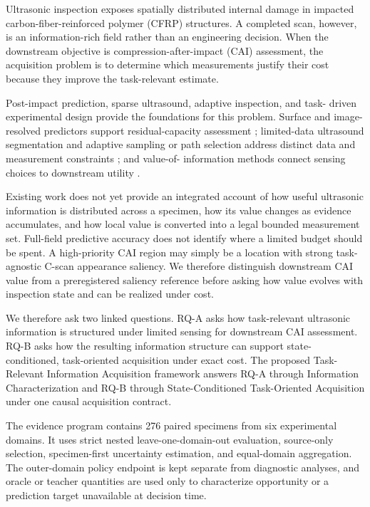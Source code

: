 \documentclass[preprint,12pt]{elsarticle}
\begin{document}
Ultrasonic inspection exposes spatially distributed internal damage in
impacted carbon-fiber-reinforced polymer (CFRP) structures. A completed scan,
however, is an information-rich field rather than an engineering decision.
When the downstream objective is compression-after-impact (CAI) assessment,
the acquisition problem is to determine which measurements justify their cost
because they improve the task-relevant estimate.

Post-impact prediction, sparse ultrasound, adaptive inspection, and task-
driven experimental design provide the foundations for this problem. Surface
and image-resolved predictors support residual-capacity assessment
\cite{hasebe2022internal,hasebe2025compression,bull2018image,mack2026cscan};
limited-data ultrasound segmentation and adaptive sampling or path
selection address distinct data and measurement constraints
\cite{nguyen2025sparse,ji2026adaptive,fuentes2020autonomous}; and value-of-
information methods connect sensing choices to downstream utility
\cite{blumberg2024experimental,memarzadeh2016value,cantero2020optimal}.

Existing work does not yet provide an integrated account of how useful
ultrasonic information is distributed across a specimen, how its value changes
as evidence accumulates, and how local value is converted into a legal bounded
measurement set. Full-field predictive accuracy does not identify where a
limited budget should be spent. A high-priority CAI region may simply be a
location with strong task-agnostic C-scan appearance saliency. We therefore
distinguish downstream CAI value from a preregistered saliency reference before
asking how value evolves with inspection state and can be realized under cost.

We therefore ask two linked questions. RQ-A asks how task-relevant ultrasonic
information is structured under limited sensing for downstream CAI assessment.
RQ-B asks how the resulting information structure can support state-
conditioned, task-oriented acquisition under exact cost. The proposed Task-
Relevant Information Acquisition framework answers RQ-A through Information
Characterization and RQ-B through State-Conditioned Task-Oriented Acquisition
under one causal acquisition contract.

The evidence program contains 276 paired specimens from six experimental
domains. It uses strict nested leave-one-domain-out evaluation, source-only
selection, specimen-first uncertainty estimation, and equal-domain
aggregation. The outer-domain policy endpoint is kept separate from diagnostic
analyses, and oracle or teacher quantities are used only to characterize
opportunity or a prediction target unavailable at decision time.
\end{document}
